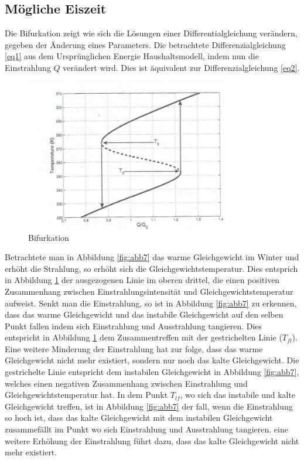 \begin{refsection}
\subsection{Mögliche Eiszeit} \label{sec:bi} 
Die Bifurkation zeigt wie sich die Lösungen einer Differentialgleichung verändern, gegeben der Änderung eines Parameters. Die betrachtete Differenzialgleichung \eqref{eq1} aus dem Ursprünglichen Energie Haushaltsmodell, indem nun die Einstrahlung $Q$ verändert wird. Dies ist äquivalent zur Differenzialgleichung \eqref{eq2}.
%
\begin{figure}
	\centering
	\includegraphics[width= 0.8\textwidth]{Bifurkation.png}
	\caption[Bifurkation]{Bifurkation}
	\label{fig:abb8}
\end{figure}
%
Betrachtete man in Abbildung \ref{fig:abb7} das warme Gleichgewicht im Winter und erhöht die Strahlung, so erhöht sich die Gleichgewichtstemperatur. Dies entsprich in Abbildung \ref{fig:abb8} der ausgezogenen Linie im oberen drittel, die einen positiven Zusammenhang zwischen Einstrahlungsintensität und Gleichgewichtstemperatur aufweist. Senkt man die Einstrahlung, so ist in Abbildung \ref{fig:abb7} zu erkennen, dass das warme Gleichgewicht und das instabile Gleichgewicht auf den selben Punkt fallen indem sich Einstrahlung und Ausstrahlung tangieren. Dies entspricht in Abbildung \ref{fig:abb8} dem Zusammentreffen mit der gestrichelten Linie ($T_{fl}$). Eine weitere Minderung der Einstrahlung hat zur folge, dass das warme Gleichgewicht nicht mehr existiert, sondern nur noch das kalte Gleichgewicht.
Die gestrichelte Linie entspricht dem instabilen Gleichgewicht in Abbildung \ref{fig:abb7}, welches einen negativen Zusammenhang zwischen Einstrahlung und Gleichgewichtstemperatur hat. In dem Punkt $T_{lf}$, wo sich das instabile und kalte Gleichgewicht treffen, ist in Abbildung \ref{fig:abb7} der fall, wenn die Einstrahlung so hoch ist, dass das kalte Gleichgewicht mit dem instabilen Gleichgewicht zusammefällt im Punkt wo sich Einstrahlung und Ausstrahlung tangieren. eine weitere Erhöhung der Einstrahlung führt dazu, dass das kalte Gleichgewicht nicht mehr existiert.

\end{refsection}
